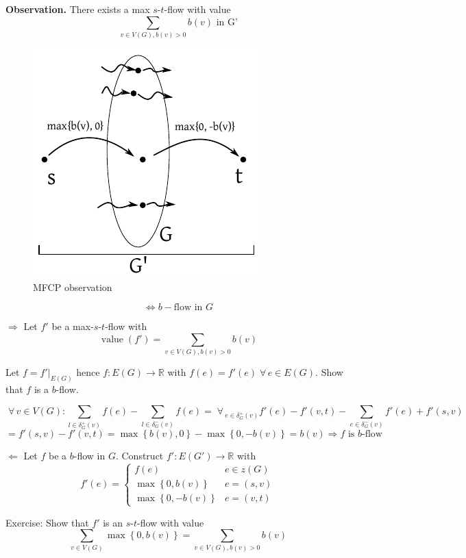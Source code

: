 \documentclass[a4paper]{article}
\theoremstyle{definition}
\newcommand{\set}[1]{\left\{#1\right\}}
\newcommand{\flow}[2]{$#1$-$#2$-flow}
\newcommand{\fall}{\;\forall\,}
\begin{document}
\textbf{Observation.}
  There exists a max \flow st with value
  \[ \sum_{v \in V(G), b(v) > 0} b(v) \text{ in G'} \]

\begin{figure}[ht]
 \begin{center}
  \includegraphics{img/mcfp_observation.pdf}
  \caption{MFCP observation}
 \end{center}
\end{figure}

\[ \Leftrightarrow b-\text{flow in } G \]

$\Rightarrow$ Let $f'$ be a max-$s$-$t$-flow with
\[ \operatorname{value}(f') = \sum_{v \in V(G), b(v) > 0} b(v) \]

Let $f = f'|_{E(G)}$ hence $f: E(G) \rightarrow \mathbb{R}$ with $f(e) = f'(e) \fall e \in E(G)$.
Show that $f$ is a $b$-flow.

\[
  \fall v \in V(G): \sum_{l \in \delta^+_G(v)} f(e) - \sum_{l \in \delta^-_G(v)} f(e)
    = \fall_{e \in \delta^+_G(v)} f'(e) - f'(v, t) - \sum_{e \in \delta^-_G(v)} f'(e)
      + f'(s, v)
\] \[
  = f'(s, v) - f'(v, t) = \max\set{b(v), 0} - \max\set{0, -b(v)}
  = b(v) \Rightarrow f \text{ is $b$-flow}
\]

$\Leftarrow$ Let $f$ be a $b$-flow in $G$.
Construct $f': E(G') \rightarrow \mathbb{R}$ with
\[
  f'(e) = \begin{cases}
    f(e)               & e \in z(G) \\
    \max\set{0, b(v)}  & e = (s, v) \\
    \max\set{0, -b(v)} & e = (v, t)
  \end{cases}
\]

Exercise: Show that $f'$ is an \flow st with value
\[ \sum_{v \in V(G)} \max\set{0, b(v)} = \sum_{v \in V(G), b(v) > 0} b(v) \]
\end{document}
